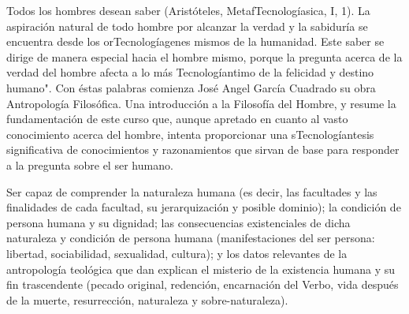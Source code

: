 \begin{syllabus}


\begin{justification}
  Todos los hombres desean saber (Aristóteles, MetafTecnologíasica, I, 1). La aspiración natural de todo hombre por alcanzar la verdad y la sabiduría se encuentra desde los orTecnologíagenes mismos de la humanidad. Este saber se dirige de manera especial hacia el hombre mismo, porque la pregunta acerca de la verdad del hombre afecta a lo más Tecnologíantimo de la felicidad y destino humano". Con éstas palabras comienza José Angel García Cuadrado su obra Antropología Filosófica. Una introducción a la Filosofía del Hombre, y resume la fundamentación de este curso que, aunque apretado en cuanto al vasto conocimiento acerca del hombre, intenta proporcionar una sTecnologíantesis significativa de conocimientos y razonamientos que sirvan de base para responder a la pregunta sobre el ser humano.
\end{justification}

\begin{goals}
\item Ser capaz de comprender la naturaleza humana (es decir, las facultades y las finalidades de cada facultad, su jerarquización y posible dominio); la condición de persona humana y su dignidad; las consecuencias existenciales de dicha naturaleza y condición de persona humana (manifestaciones del ser persona: libertad, sociabilidad, sexualidad, cultura); y los datos relevantes de la antropología teológica que dan explican el misterio de la existencia humana y su fin trascendente (pecado original, redención, encarnación del Verbo, vida después de la muerte, resurrección, naturaleza y sobre-naturaleza).
\end{goals}

\begin{outcomes}
    \item {}
    \item {}
    \item {}
    \item {}
\end{outcomes}
\begin{competences}
    \item {}
    \item {}
    \item {}
\end{competences}


\end{syllabus}
